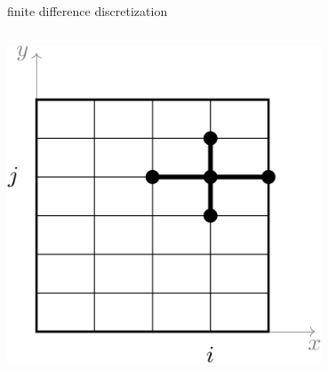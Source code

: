 \documentclass[10pt,
               svgnames,
               hyperref={colorlinks,citecolor=DeepPink4,linkcolor=FireBrick,urlcolor=Maroon},
               usepdftitle=false]{beamer}
\begin{document}
\begin{frame}{finite difference discretization}
\begin{columns}
\begin{column}{0.3\textwidth}
\vspace{15mm}
\hfill \includegraphics[width=0.7\textwidth]{images/gridstencil.png}
\end{column}
\end{columns}
\end{frame}


\end{document}
